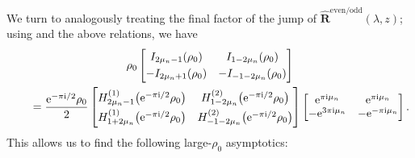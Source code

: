 \documentclass[11pt]{article}
\numberwithin{equation}{section}
\numberwithin{equation}{section}
\newcommand{\ee}{\mathrm{e}}
\newcommand{\ii}{\mathrm{i}}
\begin{document}
We turn to analogously treating the final factor of the jump of $\hat{\mathbf{R}}^{\mathrm{even/odd}}(\lambda,z)$; using \cite[equation~(10.27.7)]{DLMF} and the above relations, we have
\begin{gather*}
{\rho_0} \begin{bmatrix}I_{2\mu_n - 1}(\rho_0) & I_{1- 2\mu_n}(\rho_0)\vspace{1mm}\\
 -I_{2\mu_n +1}(\rho_0) & -I_{-1-2\mu_n}(\rho_0)\end{bmatrix} \\
 \qquad= \dfrac{\ee^{-\pi \ii/2}\rho_0}{2} \begin{bmatrix} H^{(1)}_{2\mu_n-1}\big(\ee^{-\pi \ii/2} \rho_0\big) & H^{(2)}_{1-2\mu_n}\big(\ee^{-\pi \ii/2} \rho_0\big)\vspace{1mm}\\ H^{(1)}_{1+2\mu_n}\big(\ee^{-\pi \ii/2} \rho_0\big) & H^{(2)}_{-1-2\mu_n}\big(\ee^{-\pi \ii/2} \rho_0\big)\end{bmatrix} \begin{bmatrix} \ee^{\pi \ii \mu_n}& \ee^{\pi \ii \mu_n}\\ - \ee^{3\pi \ii \mu_n} & - \ee^{-\pi \ii \mu_n} \end{bmatrix}.
\end{gather*}
This allows us to find the following large-$\rho_0$ asymptotics:
\end{document}
